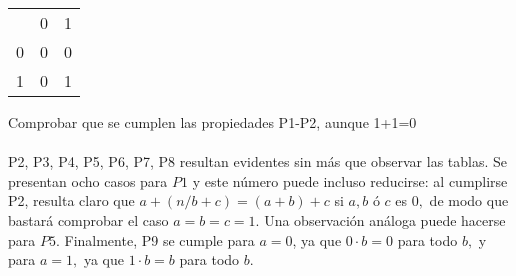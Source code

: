 \begin{enumerate}[\bfseries 1.]
\begin{multicols}{2}
\begin{center}
\begin{tabular}{c c c }
&0&1\\
0&0&0\\
1&0&1\\
\end{tabular}
\end{center}  
\end{multicols}
Comprobar que se cumplen las propiedades P1-P2, aunque 1+1=0\\\\
P2, P3, P4, P5, P6, P7, P8 resultan evidentes sin más que observar las tablas. Se presentan ocho casos para $P1$ y este número puede incluso reducirse: al cumplirse P2, resulta claro que $a+(n/b+c)=(a+b)+c$ si $a,b$ ó $c$ es $0,$ de modo que bastará comprobar el caso $a=b=c=1$. Una observación análoga puede hacerse para $P5$. Finalmente, P9 se cumple para $a=0$, ya que $0\cdot b = 0$ para todo $b,$ y para $a=1,$ ya que $1\cdot b = b$ para todo $b$.\\\\

\end{enumerate}
